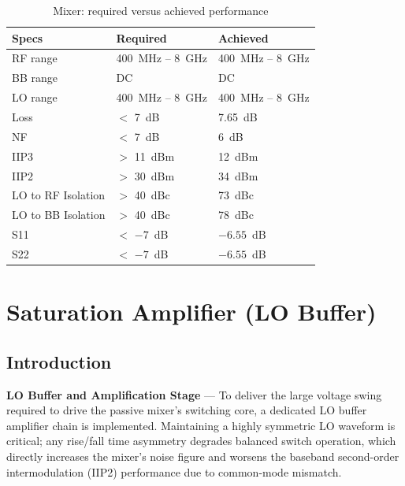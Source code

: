 \begin{table}[htbp]
    \centering
    \caption{Mixer: required versus achieved performance}
    \label{tab:mixer_required_vs_achieved}
    \begin{tabular}{lll}
        \toprule
        Specs               & Required          & Achieved \\
        \midrule
        RF range            & 400~MHz -- 8~GHz  & 400~MHz -- 8~GHz \\
        BB range            & DC                 & DC \\
        LO range            & 400~MHz -- 8~GHz  & 400~MHz -- 8~GHz \\
        Loss                & $<$ 7~dB           & 7.65~dB \\
        NF                  & $<$ 7~dB           & 6~dB \\
        IIP3                & $>$ 11~dBm         & 12~dBm \\
        IIP2                & $>$ 30~dBm         & 34~dBm \\
        LO to RF Isolation  & $>$ 40~dBc         & 73~dBc \\
        LO to BB Isolation  & $>$ 40~dBc         & 78~dBc \\
        S11                 & $<$ $-7$~dB        & $-6.55$~dB \\
        S22                 & $<$ $-7$~dB        & $-6.55$~dB \\
        \bottomrule
    \end{tabular}
\end{table}

\chapter{Saturation Amplifier (LO Buffer)}

\section{Introduction}

\textbf{LO Buffer and Amplification Stage} --- To deliver the large voltage swing required to drive the passive mixer's switching core, a dedicated LO buffer amplifier chain is implemented. Maintaining a highly symmetric LO waveform is critical; any rise/fall time asymmetry degrades balanced switch operation, which directly increases the mixer's noise figure and worsens the baseband second-order intermodulation (IIP2) performance due to common-mode mismatch.

